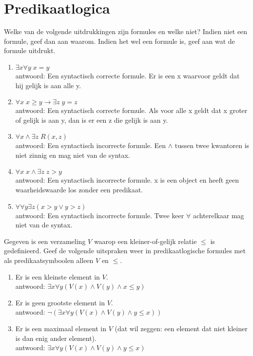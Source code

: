 \section{Predikaatlogica}

\begin{answer} %
Welke van de volgende uitdrukkingen zijn formules en welke niet? Indien niet een formule, geef dan aan waarom. Indien het wel een formule is, geef aan wat de formule uitdrukt.
\begin{enumerate}[label=\roman*.]
\item $\exists x\forall y\;x=y$ \\
antwoord: Een syntactisch correcte formule. Er is een x waarvoor geldt dat hij gelijk is aan alle y. 
\item $\forall x\;x\geq y\rightarrow\exists z\; y=z$ \\
antwoord: Een syntactisch correcte formule. Als voor alle x geldt dat x groter of gelijk is aan y, dan is er een z die gelijk is aan y.
\item $\forall x\wedge\exists z\;R(x,z)$ \\
antwoord: Een syntactisch incorrecte formule. Een $\land$ tussen twee kwantoren is niet zinnig en mag niet van de syntax. 
\item $\forall x\;x\wedge\exists z\;z>y$ \\
antwoord: Een syntactisch incorrecte formule. x is een object en heeft geen waarheidswaarde los zonder een predikaat.
\item $\forall \forall y\exists z(x>y\vee y>z)$ \\ 
antwoord: Een syntactisch incorrecte formule. Twee keer $\forall$ achterelkaar mag niet van de syntax.
\end{enumerate}
\end{answer}

\begin{answer} %
Gegeven is een verzameling $V$ waarop een kleiner-of-gelijk relatie $\leq$ is gedefinieerd. Geef de volgende uitspraken weer in predikaatlogische formules met als predikaatsymboolen alleen $V$ en $\leq$.
\begin{enumerate}[label=\roman*.]
\item Er is een kleinste element in $V$. \\
antwoord: $\exists x \forall y (V(x) \land V(y) \land x \leq y)$
\item Er is geen grootste element in $V$. \\
antwoord: $\neg (\exists x \forall y (V(x) \land V(y) \land y \leq x))$ 
\item Er is een maximaal element in $V$ (dat wil zeggen: een element dat niet kleiner is dan enig ander element).\\
antwoord: $\exists x \forall y (V(x) \land V(y) \land y \leq x)$
\end{enumerate}
\end{answer}

